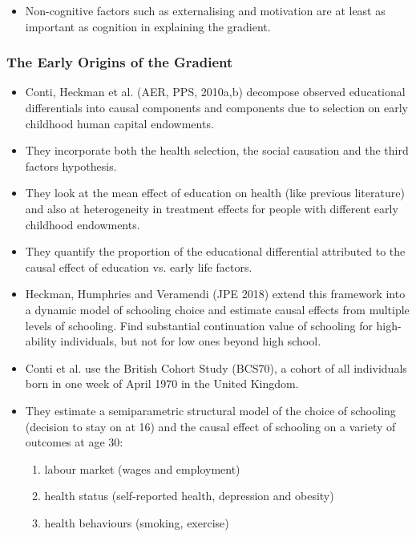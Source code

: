 \begin{itemize}
        \item Non-cognitive factors such as externalising and motivation are at least as important as cognition in explaining the gradient.
\end{itemize}

\subsubsection{The Early Origins of the Gradient}

\begin{itemize}
        \item Conti, Heckman et al. (AER, PPS, 2010a,b) decompose observed educational differentials into causal components and components due to selection on early childhood human capital endowments.
        \item They incorporate both the health selection, the social causation and the third factors hypothesis.
        \item They look at the mean effect of education on health (like previous literature) and also at heterogeneity in treatment effects for people with different early childhood endowments.
        \item They quantify the proportion of the educational differential attributed to the causal effect of education vs. early life factors. 
        \item Heckman, Humphries and Veramendi (JPE 2018) extend this framework into a dynamic model of schooling choice and estimate causal effects from multiple levels of schooling. Find substantial continuation value of schooling for high-ability individuals, but not for low ones beyond high school.
        \item Conti et al. use the British Cohort Study (BCS70), a cohort of all individuals born in one week of April 1970 in the United Kingdom.
        \item They estimate a semiparametric structural model of the choice of schooling (decision to stay on at 16) and the causal effect of schooling on a variety of outcomes at age 30: 
        \begin{enumerate}
            \item labour market (wages and employment)
            \item health status (self-reported health, depression and obesity)
            \item health behaviours (smoking, exercise)
        \end{enumerate}

\end{itemize}
